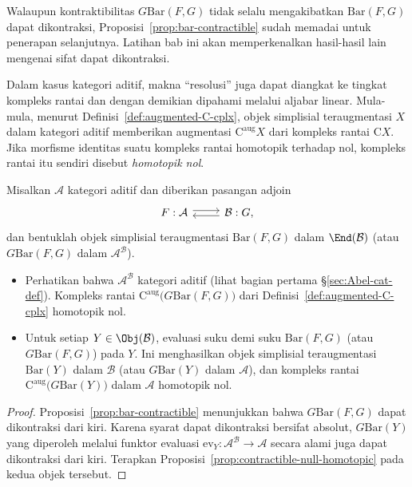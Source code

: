 Walaupun kontraktibilitas
$G\mathrm{Bar}(F,G)$ tidak selalu mengakibatkan
$\mathrm{Bar}(F,G)$ dapat dikontraksi,
Proposisi~\ref{prop:bar-contractible} sudah memadai untuk penerapan
selanjutnya. Latihan bab ini akan memperkenalkan hasil-hasil lain mengenai
sifat dapat dikontraksi.

Dalam kasus kategori aditif, makna ``resolusi'' juga dapat
diangkat ke tingkat kompleks rantai dan dengan demikian dipahami
melalui aljabar linear. Mula-mula, menurut
Definisi~\ref{def:augmented-C-cplx}, objek simplisial teraugmentasi $X$
dalam kategori aditif memberikan augmentasi $\mathrm{C}^{\mathrm{aug}}X$
dari kompleks rantai $\mathrm{C}X$. Jika morfisme identitas suatu kompleks
rantai homotopik terhadap nol, kompleks rantai itu sendiri disebut
	\emph{homotopik nol}.

\begin{theorem}\label{prop:bar-null-homotopic}
	Misalkan $\mathcal{A}$ kategori aditif dan diberikan pasangan adjoin
	\[\begin{tikzcd}
		F : \mathcal{A} \arrow[shift left, r] & \mathcal{B}: G, \arrow[shift left, l]
	\end{tikzcd}\]
	dan bentuklah objek simplisial teraugmentasi
	$\mathrm{Bar}(F,G)$ dalam $\End(\mathcal{B})$ (atau
	$G\mathrm{Bar}(F,G)$ dalam $\mathcal{A}^{\mathcal{B}}$).
	\begin{itemize}
		\item Perhatikan bahwa $\mathcal{A}^{\mathcal{B}}$ kategori aditif
		(lihat bagian pertama \S\ref{sec:Abel-cat-def}). Kompleks rantai
		$\mathrm{C}^{\mathrm{aug}}\bigl(G\mathrm{Bar}(F,G)\bigr)$ dari
		Definisi~\ref{def:augmented-C-cplx} homotopik nol.
		\item Untuk setiap $Y\in\Obj(\mathcal{B})$, evaluasi suku demi suku
		$\mathrm{Bar}(F,G)$ (atau $G\mathrm{Bar}(F,G)$) pada $Y$. Ini menghasilkan objek simplisial teraugmentasi
		$\mathrm{Bar}(Y)$ dalam $\mathcal{B}$ (atau
		$G\mathrm{Bar}(Y)$ dalam $\mathcal{A}$), dan kompleks rantai
		$\mathrm{C}^{\mathrm{aug}}\bigl(G\mathrm{Bar}(Y)\bigr)$ dalam
		$\mathcal{A}$ homotopik nol.
	\end{itemize}
\end{theorem}
\begin{proof}
	Proposisi~\ref{prop:bar-contractible} menunjukkan bahwa
	$G\mathrm{Bar}(F,G)$ dapat dikontraksi dari kiri. Karena syarat dapat
	dikontraksi bersifat absolut, $G\mathrm{Bar}(Y)$ yang diperoleh melalui
	funktor evaluasi $\mathrm{ev}_Y:\mathcal{A}^{\mathcal{B}}\to\mathcal{A}$
	secara alami juga dapat dikontraksi dari kiri.
	Terapkan Proposisi~\ref{prop:contractible-null-homotopic} pada kedua
	objek tersebut.
\end{proof}

